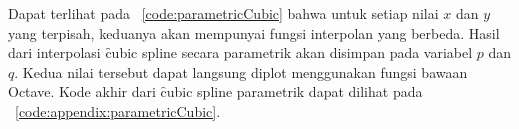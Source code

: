 

Dapat terlihat pada \lst~\ref{code:parametricCubic} bahwa untuk setiap nilai $x$
dan $y$ yang terpisah, keduanya akan mempunyai fungsi interpolan yang berbeda.
Hasil dari interpolasi \f{cubic spline} secara parametrik akan disimpan pada
variabel $p$ dan $q$. Kedua nilai tersebut dapat langsung diplot menggunakan
fungsi bawaan Octave. Kode akhir dari \f{cubic spline} parametrik dapat dilihat
pada \apdx~\ref{code:appendix:parametricCubic}.





